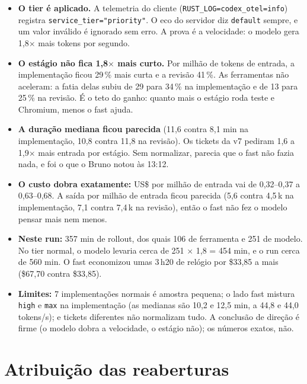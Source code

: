 \documentclass[11pt,a4paper]{article}
\begin{document}
\medskip
\begin{itemize}
  \item \textbf{O tier é aplicado.} A telemetria do cliente
        (\texttt{RUST\_LOG=codex\_otel=info}) registra
        \texttt{service\_tier="priority"}. O eco do servidor diz
        \texttt{default} sempre, e um valor inválido é ignorado sem erro. A
        prova é a velocidade: o modelo gera 1,8$\times$ mais tokens por segundo.
  \item \textbf{O estágio não fica 1,8$\times$ mais curto.} Por milhão de
        tokens de entrada, a implementação ficou 29\,\% mais curta e a revisão
        41\,\%. As ferramentas não aceleram: a fatia delas subiu de 29 para
        34\,\% na implementação e de 13 para 25\,\% na revisão. É o teto do
        ganho: quanto mais o estágio roda teste e Chromium, menos o fast ajuda.
  \item \textbf{A duração mediana ficou parecida} (11,6 contra 8,1 min na
        implementação, 10,8 contra 11,8 na revisão). Os tickets da v7 pediram
        1,6 a 1,9$\times$ mais entrada por estágio. Sem normalizar, parecia que
        o fast não fazia nada, e foi o que o Bruno notou às 13:12.
  \item \textbf{O custo dobra exatamente:} US\$ por milhão de entrada vai de
        0,32--0,37 a 0,63--0,68. A saída por milhão de entrada ficou parecida
        (5,6 contra 4,5\,k na implementação, 7,1 contra 7,4\,k na revisão), então
        o fast não fez o modelo pensar mais nem menos.
  \item \textbf{Neste run:} 357 min de rollout, dos quais 106 de ferramenta e
        251 de modelo. No tier normal, o modelo levaria cerca de
        251 $\times$ 1,8 = 454 min, e o run cerca de 560 min. O fast economizou
        umas 3\,h20 de relógio por \$33,85 a mais (\$67,70 contra \$33,85).
  \item \textbf{Limites:} 7 implementações normais é amostra pequena; o lado
        fast mistura \texttt{high} e \texttt{max} na implementação (as
        medianas são 10,2 e 12,5 min, a 44,8 e 44,0 tokens/s); e tickets
        diferentes não normalizam tudo. A conclusão de direção é firme (o
        modelo dobra a velocidade, o estágio não); os números exatos, não.
\end{itemize}

\section{Atribuição das reaberturas}
\end{document}
